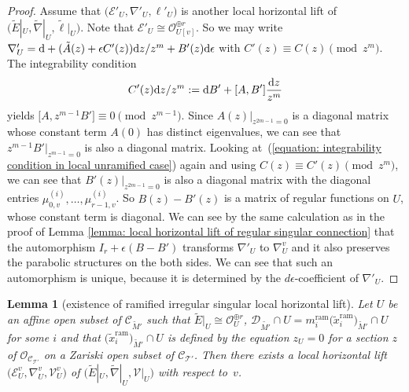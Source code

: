 \documentclass[pdftex]{sigma}
\numberwithin{equation}{section}
\newtheorem{Lemma}[Theorem]{Lemma}
\begin{document}
\begin{proof}
Assume that $\big({\mathcal E}'_U,\nabla'_U,\ell'_U\big)$
is another local horizontal lift of
$\big(\tilde{E}|_U,\tilde{\nabla}|_U,\tilde{\ell}|_U\big)$.
Note that ${{\mathcal E}'_U\cong{\mathcal O}_{U[v]}^{\oplus r}}$.
So we may write
$\nabla'_U={\rm d}+(\tilde{A}(z)+\epsilon C'(z)){\rm d}z/z^m+ B'(z){\rm d}\epsilon$
with $C'(z)\equiv C(z) \pmod{z^m}$.
The integrability condition
\begin{equation} \label{equation: integrability condition in local unramified case}
 C'(z){\rm d}z/z^m
 :=
 {\rm d}B'+[A,B']\frac{{\rm d}z}{z^m}
\end{equation}
yields $\big[A,z^{m-1}B'\big]\equiv 0 \pmod{z^{m-1}}$.
Since $A(z)|_{z^{2m-1}=0}$ is a diagonal matrix whose constant term $A(0)$ has distinct eigenvalues,
we can see that $z^{m-1}B'|_{z^{m-1}=0}$ is also a diagonal matrix.
Looking at~(\ref{equation: integrability condition in local unramified case}) again
and using $C(z)\equiv C'(z) \pmod{z^m}$,
we can see that
$B'(z)|_{z^{2m-1}=0}$ is also a diagonal matrix
with the diagonal entries $\mu^{(i)}_{0,v},\dots,\mu^{(i)}_{r-1,v}$.
So $B(z)-B'(z)$ is a matrix of regular functions on $U$,
whose constant term is diagonal.
We can see by the same calculation as in the proof of
Lemma \ref{lemma: local horizontal lift of regular singular connection}
that the automorphism
$I_r+\epsilon(B-B')$ transforms
$\nabla'_U$ to $\nabla^v_U$
and it also preserves the parabolic structures on the both sides.
We can see that such an automorphism is unique,
because it is determined by the $d\epsilon$-coefficient
of $\nabla'_U$.
\end{proof}

\begin{Lemma}[existence of ramified irregular singular local horizontal lift]\label{lemma: existence of local horizontal lift of ramified connection}
Let $U$ be an affine open subset of ${\mathcal C}_{\tilde{M}'}$
such that
$\tilde{E}|_U\cong{\mathcal O}_U^{\oplus r}$,
${\mathcal D}_{\tilde{M'}}\cap U=
m^{\mathrm{ram}}_i\big(\tilde{x}^{\mathrm{ram}}_i\big)_{\tilde{M}'}\cap U$
for some $i$ and that
$\big(\tilde{x}^{\mathrm{ram}}_i\big)_{\tilde{M}'}\cap U$
is defined by the equation $z_U=0$
for a section $z$ of ${\mathcal O}_{{\mathcal C}_{\mathcal T'}}$
on a Zariski open subset of ${\mathcal C}_{\mathcal T'}$.
Then there exists a local horizontal lift
$\big({\mathcal E}^v_U,\nabla^v_U, {\mathcal V}^v_U\big)$
of
$\big(\tilde{E}|_U,\tilde{\nabla}|_U,{\mathcal V}|_U\big)$
with respect to~$v$.
\end{Lemma}
\end{document}
